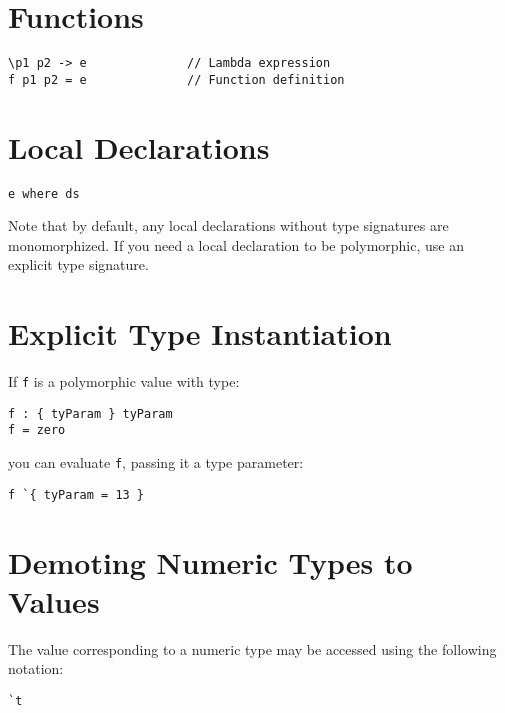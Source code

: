 \hypertarget{functions}{%
\section{Functions}\label{functions}}

\begin{verbatim}
\p1 p2 -> e              // Lambda expression
f p1 p2 = e              // Function definition
\end{verbatim}

\hypertarget{local-declarations}{%
\section{Local Declarations}\label{local-declarations}}

\begin{verbatim}
e where ds
\end{verbatim}

Note that by default, any local declarations without type signatures are
monomorphized. If you need a local declaration to be polymorphic, use an
explicit type signature.

\hypertarget{explicit-type-instantiation}{%
\section{Explicit Type
Instantiation}\label{explicit-type-instantiation}}

If \texttt{f} is a polymorphic value with type:

\begin{verbatim}
f : { tyParam } tyParam
f = zero
\end{verbatim}

you can evaluate \texttt{f}, passing it a type parameter:

\begin{verbatim}
f `{ tyParam = 13 }
\end{verbatim}

\hypertarget{demoting-numeric-types-to-values}{%
\section{Demoting Numeric Types to
Values}\label{demoting-numeric-types-to-values}}

The value corresponding to a numeric type may be accessed using the
following notation:

\begin{verbatim}
`t
\end{verbatim}

